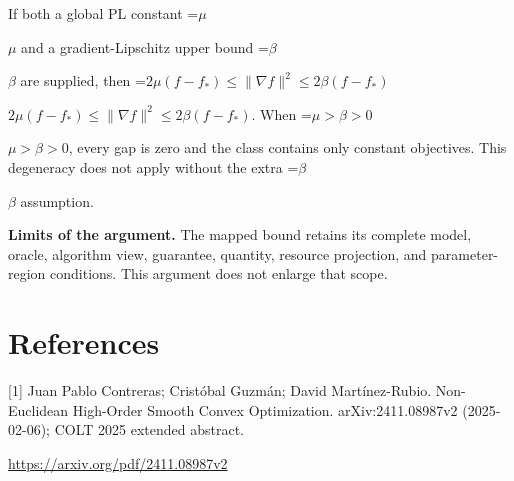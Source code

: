 \documentclass[10pt,a4paper]{article}
\newcommand{\AtlasMath}[1]{\par\begingroup\centering\setbox0=\hbox{$\displaystyle #1$}\ifdim\wd0>1.4\linewidth\typeout{ATLAS WIDE FORMULA: \the\wd0}\fi\ifdim\wd0>\linewidth\resizebox{\linewidth}{!}{\box0}\else\box0\fi\par\endgroup}
\newcommand{\AtlasInlineMath}[1]{\begingroup\setbox0=\hbox{$#1$}\ifdim\wd0>.4\linewidth\endgroup\AtlasMath{#1}\else\endgroup$#1$\fi}
\begin{document}
If both a global PL constant \AtlasInlineMath{\mu} and a gradient-Lipschitz upper bound \AtlasInlineMath{\beta} are supplied, then \AtlasInlineMath{2\mu(f-f_*)\le\|\nabla f\|^2\le2\beta(f-f_*)}. When \AtlasInlineMath{\mu>\beta>0}, every gap is zero and the class contains only constant objectives. This degeneracy does not apply without the extra \AtlasInlineMath{\beta} assumption.

\textbf{Limits of the argument.} The mapped bound retains its complete model, oracle, algorithm view, guarantee, quantity, resource projection, and parameter-region conditions. This argument does not enlarge that scope.

\section{References}
[1] Juan Pablo Contreras; Cristóbal Guzmán; David Martínez-Rubio. Non-Euclidean High-Order Smooth Convex Optimization. arXiv:2411.08987v2 (2025-02-06); COLT 2025 extended abstract.

\url{https://arxiv.org/pdf/2411.08987v2}
\end{document}
